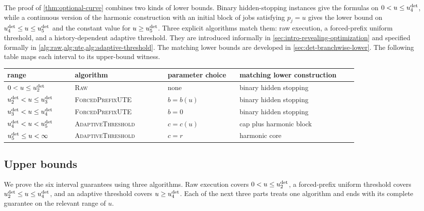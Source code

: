 The proof of \cref{thm:optional-curve} combines two kinds of lower bounds.
Binary hidden-stopping instances give the formulas on
$0<u\le u_{4}^{\mathrm{det}}$, while a continuous version of the harmonic construction
with an initial block of jobs satisfying $p_j=u$ gives the lower bound on
$u_{4}^{\mathrm{det}}\le u\le u_{5}^{\mathrm{det}}$ and the constant value for
$u\ge u_{5}^{\mathrm{det}}$.  Three
explicit algorithms match them: raw execution, a forced-prefix uniform
threshold, and a history-dependent adaptive threshold.  They are introduced
informally in \cref{sec:intro-revealing-optimization} and specified formally
in \cref{alg:raw,alg:ute,alg:adaptive-threshold}.  The matching lower bounds
are developed in \cref{sec:det-branchwise-lower}.  The following table maps
each interval to its upper-bound witness.

\begin{center}
\footnotesize
\begin{tabular}{@{}L{0.16\linewidth}L{0.22\linewidth}L{0.17\linewidth}L{0.29\linewidth}@{}}
\toprule
range & algorithm & parameter choice & matching lower construction \\
\midrule
$0<u\le u_{2}^{\mathrm{det}}$
 & \textsc{Raw} & none & binary hidden stopping \\
$u_{2}^{\mathrm{det}}<u\le u_{3}^{\mathrm{det}}$
 & \textsc{ForcedPrefixUTE} & $b=b(u)$ & binary hidden stopping \\
$u_{3}^{\mathrm{det}}<u\le u_{4}^{\mathrm{det}}$
 & \textsc{ForcedPrefixUTE} & $b=0$ & binary hidden stopping \\
$u_{4}^{\mathrm{det}}<u<u_{5}^{\mathrm{det}}$
 & \textsc{AdaptiveThreshold} & $c=c(u)$ & cap plus harmonic block \\
$u_{5}^{\mathrm{det}}\le u<\infty$
 & \textsc{AdaptiveThreshold} & $c=r$ & harmonic core \\
\bottomrule
\end{tabular}
\end{center}

\subsection{Upper bounds}
\label{sec:det-algorithm-guarantees}

We prove the six interval guarantees using three algorithms.  Raw execution
covers $0<u\le u_{2}^{\mathrm{det}}$, a forced-prefix uniform threshold covers
$u_{2}^{\mathrm{det}}\le u\le u_{4}^{\mathrm{det}}$, and an adaptive threshold covers
$u\ge u_{4}^{\mathrm{det}}$.
Each of the next three parts treats one algorithm and ends with its
complete guarantee on the relevant range of $u$.



